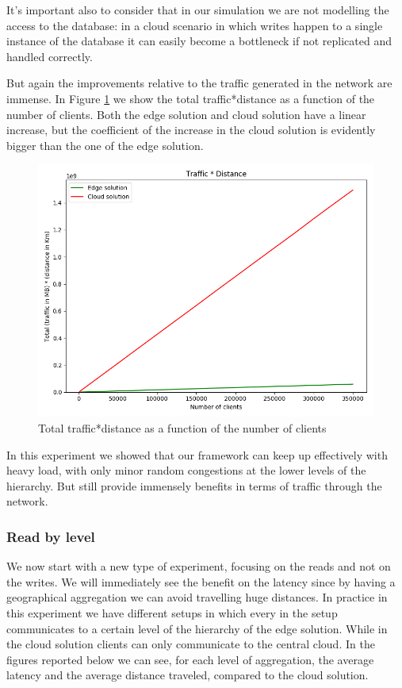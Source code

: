 It's important also to consider that in our simulation we are not modelling the access to the database: in a cloud scenario in which writes happen to a single instance of the database it can easily become a bottleneck if not replicated and handled correctly.

But again the improvements relative to the traffic generated in the network are immense. In Figure \ref{fig:/write-all-clients-traffic} we show the total traffic*distance as a function of the number of clients. Both the edge solution and cloud solution have a linear increase, but the coefficient of the increase in the cloud solution is evidently bigger than the one of the edge solution.

\begin{figure}[H]
    \centering
    \includegraphics[width=0.86\linewidth]{Figures/Evaluation/write-all-clients-traffic.png}
    \caption{Total traffic*distance as a function of the number of clients}
    \label{fig:/write-all-clients-traffic}
\end{figure}

In this experiment we showed that our framework can keep up effectively with heavy load, with only minor random congestions at the lower levels of the hierarchy. But still provide immensely benefits in terms of traffic through the network.


\subsubsection{Read by level}
We now start with a new type of experiment, focusing on the reads and not on the writes. We will immediately see the benefit on the latency since by having a geographical aggregation we can avoid travelling huge distances.
In practice in this experiment we have different setups in which every  in the setup communicates to a certain level of the hierarchy of the edge solution. While in the cloud solution clients can only communicate to the central cloud.
In the figures reported below we can see, for each level of aggregation, the average latency and the average distance traveled, compared to the cloud solution.

